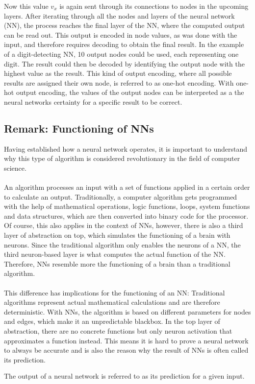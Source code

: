 \documentclass[11pt]{report}
\newcommand{\mydeflabel}{}
\newenvironment{mydef}[1]
{\renewcommand\mydeflabel{#1}\begin{mydefinner}}
{\end{mydefinner}}
\begin{document}
    Now this value $v_x$ is again sent through its connections to nodes in the upcoming layers.
    After iterating through all the nodes and layers of the neural network (NN), the process reaches the final layer of the NN, where the computed output can be read out.
    This output is encoded in node values, as was done with the input, and therefore requires decoding to obtain the final result.
    In the example of a digit-detecting NN, 10 output nodes could be used, each representing one digit.
    The result could then be decoded by identifying the output node with the highest value as the result.
    This kind of output encoding, where all possible results are assigned their own node, is referred to as one-hot encoding.
    With one-hot output encoding, the values of the output nodes can be interpreted as a the neural networks certainty for a specific result to be correct.

    \subsection{Remark: Functioning of NNs}\label{subsec:remark-about-the-funtioning-of-nns}
    Having established how a neural network operates, it is important to understand why this type of algorithm is considered revolutionary in the field of computer science.
    \\ \\
    An algorithm processes an input with a set of functions applied in a certain order to calculate an output.
    Traditionally, a computer algorithm gets programmed with the help of mathematical operations, logic functions, loops, system functions and data structures, which are then converted into binary code for the processor.
    Of course, this also applies in the context of NNs, however, there is also a third layer of abstraction on top, which simulates the functioning of a brain with neurons.
    Since the traditional algorithm only enables the neurons of a NN, the third neuron-based layer is what computes the actual function of the NN\@.
    Therefore, NNs resemble more the functioning of a brain than a traditional algorithm.
    \\ \\
    This difference has implications for the functioning of an NN:
    Traditional algorithms represent actual mathematical calculations and are therefore deterministic.
    With NNs, the algorithm is based on different parameters for nodes and edges, which make it an unpredictable blackbox.
    In the top layer of abstraction, there are no concrete functions but only neuron activation that approximates a function instead.
    This means it is hard to prove a neural network to always be accurate and is also the reason why the result of NNs is often called its prediction.
    \begin{mydef}{NN Prediction}
        The output of a neural network is referred to as its prediction for a given input.
    \end{mydef}
\end{document}
